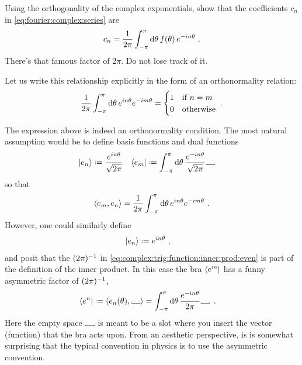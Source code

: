 \documentclass[12pt, oneside]{report}    %
\begin{document}
\begin{exercise}
Using the orthogonality of the complex exponentials, show that the coefficients $c_n$ in \eqref{eq:fourier:complex:series} are
\begin{align}
    c_n = \frac{1}{2\pi}\int_{-\pi}^\pi \operatorname{d}\!{\theta}\, f(\theta)\, e^{-in\theta} \ .
\end{align}
There's that famous factor of $2\pi$. Do not lose track of it.
\end{exercise}

Let us write this relationship explicitly in the form of an orthonormality relation:
\begin{align}
    \frac{1}{2\pi}
    \int_{-\pi}^\pi \operatorname{d}\!{\theta} \,
    {e^{in\theta}}
    {e^{-im\theta}}
    = 
    \begin{cases}
    1 &\textnormal{if } n=m\\
    0 &\textnormal{otherwise}
    \end{cases}
    \ .
\end{align}
\begin{example}
The expression above is indeed an orthonormality condition. The most natural assumption would be to define basis functions and dual functions
\begin{align}
    \ket{e_n} &\defeq \frac{e^{in\theta}}{\sqrt{2\pi}}
    &
    \bra{e_m} &\defeq 
    \int_{-\pi}^\pi \D{\theta} \, 
    \frac{e^{-in\theta}}{\sqrt{2\pi}}
    \Vtextvisiblespace[1em]{} \,
\end{align}
so that
\begin{align}
    \langle e_m, e_n \rangle 
    =
    \frac{1}{2\pi}
    \int_{-\pi}^\pi \operatorname{d}\!{\theta} \,
    {e^{in\theta}}
    {e^{-im\theta}}
     \ .
     \label{eq:complex:trig:function:inner:prod:even}
\end{align}
However, one could similarly define
\begin{align}
    \ket{e_n} &\defeq {e^{in\theta}}\ ,
\end{align} 
and posit that the $(2\pi)^{-1}$ in \eqref{eq:complex:trig:function:inner:prod:even} is part of the definition of the inner product. In this case the bra $\left\langle e^m\right|$ has a funny asymmetric factor of $(2\pi)^{-1}$,
\begin{align}
    \bra{e^n} &\defeq \la e_n(\theta), \Vtextvisiblespace[1em]{} \ra 
    =
    \int_{-\pi}^\pi \D{\theta} \,
     \frac
    {e^{-in\theta}}
     {{2\pi}}
     \Vtextvisiblespace[1em]{} \,
    \ .
\end{align}
Here the empty space $\Vtextvisiblespace[1em]{}$ is meant to be a slot where you insert the vector (function) that the bra acts upon. From an aesthetic perspective, is is somewhat surprising that the typical convention in physics is to use the asymmetric convention.
\end{example}
\end{document}
